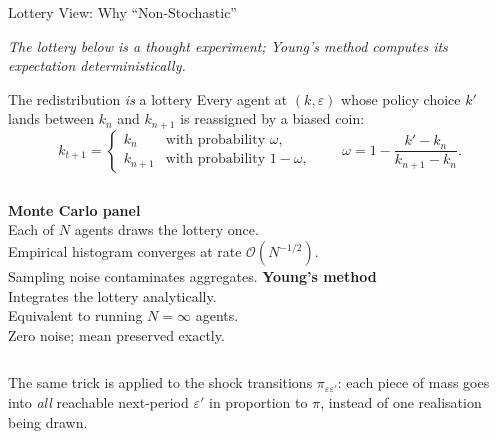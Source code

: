 \documentclass[aspectratio=169,11pt]{beamer}
\newcommand{\emphc}[1]{\textcolor{harvardcrimson}{#1}}
\begin{document}
\begin{frame}[shrink=10]{Lottery View: Why ``Non-Stochastic''}
\small
\begin{center}\itshape\footnotesize\color{harvardcrimson}
The lottery below is a thought experiment; Young's method computes its expectation deterministically.
\end{center}
\begin{block}{The redistribution \emph{is} a lottery}
Every agent at $(k, \varepsilon)$ whose policy choice $k'$ lands between $k_n$ and $k_{n+1}$ is reassigned by a \emphc{biased coin}:
\[
k_{t+1} = \begin{cases} k_n     & \text{with probability } \omega,\\ k_{n+1} & \text{with probability } 1-\omega,\end{cases}
\qquad \omega = 1 - \frac{k' - k_n}{k_{n+1} - k_n}.
\]
\end{block}

\begin{columns}[T]
\textbf{Monte Carlo panel}\\[2pt]
Each of $N$ agents \emphc{draws the lottery once}.\\
Empirical histogram converges at rate $\mathcal{O}(N^{-1/2})$.\\
Sampling noise contaminates aggregates.
\textbf{Young's method}\\[2pt]
\emphc{Integrates the lottery analytically.}\\
Equivalent to running $N = \infty$ agents.\\
Zero noise; mean preserved exactly.
\end{columns}

\vspace{0.2em}
{\footnotesize The same trick is applied to the shock transitions $\pi_{\varepsilon\varepsilon'}$: each piece of mass goes into \emph{all} reachable next-period $\varepsilon'$ in proportion to $\pi$, instead of one realisation being drawn.}
\end{frame}
\end{document}
